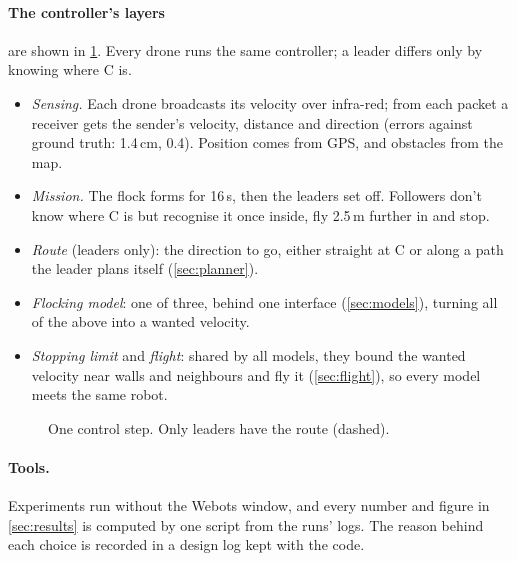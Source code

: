 \paragraph{The controller's layers} are shown in \cref{fig:layers}. Every
drone runs the same controller; a leader differs only by knowing where C is.
\begin{itemize}
  \item \emph{Sensing.} Each drone broadcasts its velocity over infra-red;
        from each packet a receiver gets the sender's velocity, distance and
        direction (errors against ground truth: 1.4\,cm, 0.4\textdegree).
        Position comes from GPS, and obstacles from the map.
  \item \emph{Mission.} The flock forms for 16\,s, then the leaders set off.
        Followers don't know where C is but recognise it once inside, fly
        2.5\,m further in and stop.
  \item \emph{Route} (leaders only): the direction to go, either straight at
        C or along a path the leader plans itself (\cref{sec:planner}).
  \item \emph{Flocking model}: one of three, behind one interface
        (\cref{sec:models}), turning all of the above into a wanted velocity.
  \item \emph{Stopping limit} and \emph{flight}: shared by all models, they
        bound the wanted velocity near walls and neighbours and fly it
        (\cref{sec:flight}), so every model meets the same robot.
\end{itemize}

\begin{figure}[tbp]
  \centering
  
  \caption{One control step. Only leaders have the route (dashed).}
  \label{fig:layers}
\end{figure}

\paragraph{Tools.} Experiments run without the Webots window, and every
number and figure in \cref{sec:results} is computed by one script from the
runs' logs. The reason behind each choice is recorded in a design log kept
with the code.
